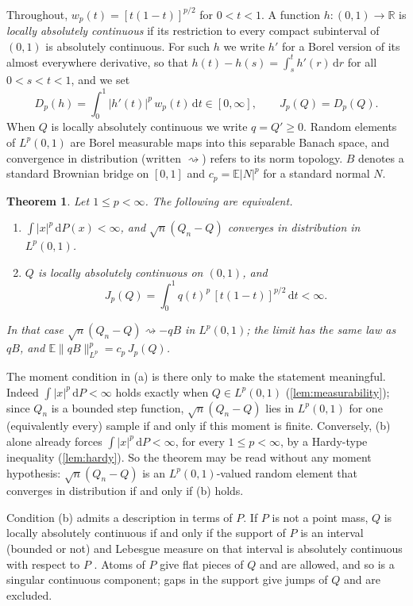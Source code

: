 \documentclass[11pt]{amsart}
\newtheorem{theorem}{Theorem}[section]
\theoremstyle{remark}
\newcommand{\R}{\mathbb{R}}
\newcommand{\E}{\mathbb{E}}
\newcommand{\dd}{\,\mathrm{d}}
\newcommand{\Lp}{L^p(0,1)}
\newcommand{\weak}{\rightsquigarrow}
\begin{document}
Throughout, $w_p(t)=[t(1-t)]^{p/2}$ for $0<t<1$. A function $h:(0,1)\to\R$ is \emph{locally absolutely continuous} if its restriction to every compact subinterval of $(0,1)$ is absolutely continuous. For such $h$ we write $h'$ for a Borel version of its almost everywhere derivative, so that $h(t)-h(s)=\int_s^t h'(r)\dd r$ for all $0<s<t<1$, and we set
\[
D_p(h)=\int_0^1 |h'(t)|^p\,w_p(t)\dd t\in[0,\infty],\qquad J_p(Q)=D_p(Q).
\]
When $Q$ is locally absolutely continuous we write $q=Q'\ge0$. Random elements of $\Lp$ are Borel measurable maps into this separable Banach space, and convergence in distribution (written $\weak$) refers to its norm topology. $B$ denotes a standard Brownian bridge on $[0,1]$ and $c_p=\E|N|^p$ for a standard normal $N$.

\begin{theorem}\label{thm:main}
Let $1\le p<\infty$. The following are equivalent.
\begin{enumerate}
\item[(a)] $\int|x|^p\dd P(x)<\infty$, and $\sqrt n(Q_n-Q)$ converges in distribution in $\Lp$.
\item[(b)] $Q$ is locally absolutely continuous on $(0,1)$, and
\[
J_p(Q)=\int_0^1 q(t)^p\,[t(1-t)]^{p/2}\dd t<\infty .
\]
\end{enumerate}
In that case $\sqrt n(Q_n-Q)\weak -qB$ in $\Lp$; the limit has the same law as $qB$, and $\E\|qB\|_{L^p}^p=c_p\,J_p(Q)$.
\end{theorem}

The moment condition in (a) is there only to make the statement meaningful. Indeed $\int|x|^p\dd P<\infty$ holds exactly when $Q\in\Lp$ (\cref{lem:measurability}); since $Q_n$ is a bounded step function, $\sqrt n(Q_n-Q)$ lies in $\Lp$ for one (equivalently every) sample if and only if this moment is finite. Conversely, (b) alone already forces $\int|x|^p\dd P<\infty$, for every $1\le p<\infty$, by a Hardy-type inequality (\cref{lem:hardy}). So the theorem may be read without any moment hypothesis: $\sqrt n(Q_n-Q)$ is an $\Lp$-valued random element that converges in distribution if and only if (b) holds.

Condition (b) admits a description in terms of $P$. If $P$ is not a point mass, $Q$ is locally absolutely continuous if and only if the support of $P$ is an interval (bounded or not) and Lebesgue measure on that interval is absolutely continuous with respect to $P$ \cite[Proposition~A.17]{BobkovLedoux2019}. Atoms of $P$ give flat pieces of $Q$ and are allowed, and so is a singular continuous component; gaps in the support give jumps of $Q$ and are excluded.
\end{document}
